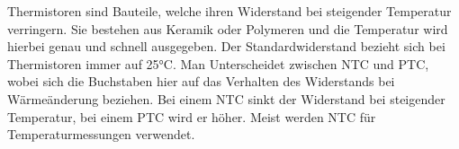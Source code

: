 Thermistoren sind Bauteile, welche ihren Widerstand bei steigender Temperatur
verringern. Sie bestehen aus Keramik oder Polymeren und die Temperatur wird
hierbei genau und schnell ausgegeben. Der Standardwiderstand bezieht sich
bei Thermistoren immer auf 25°C. Man Unterscheidet zwischen NTC und PTC, wobei
sich die Buchstaben hier auf das Verhalten des Widerstands bei Wärmeänderung
beziehen. Bei einem NTC sinkt der Widerstand bei steigender Temperatur, bei
einem PTC wird er höher. Meist werden NTC für Temperaturmessungen verwendet.\cite{hering2018temperaturmesstechnik}